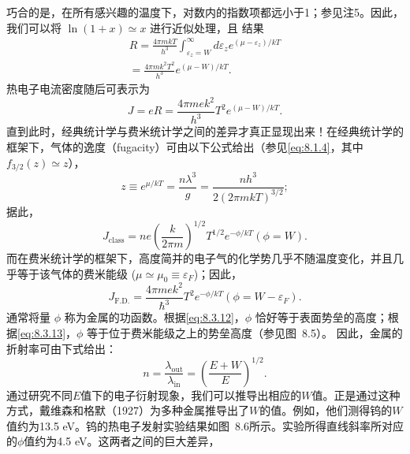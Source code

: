 巧合的是，在所有感兴趣的温度下，对数内的指数项都远小于1；参见注5。因此，我们可以将 \(\ln(1+x) \simeq x\) 进行近似处理，且
结果
\begin{equation}\tag{8.3.9}\label{eq:8.3.9}
\begin{array}{r} { R = \frac { 4 \pi m k T } { h ^{3} } \int _ { \varepsilon _ { z } = W } ^{\infty} d \varepsilon _ { z } e ^{( \mu - \varepsilon _ { z} ) / k T } } \\{ = \frac { 4 \pi m k ^{2} T ^{2} } { h ^{3} } e ^{( \mu - W ) / k T} . } \end{array}
\end{equation}
热电子电流密度随后可表示为
\begin{equation}\tag{8.3.10}\label{eq:8.3.10}
J = e R = \frac { 4 \pi m e k ^{2} } { h ^{3} } T ^{2} e ^{( \mu - W ) / k T} .
\end{equation}
直到此时，经典统计学与费米统计学之间的差异才真正显现出来！在经典统计学的框架下，气体的逸度（fugacity）可由以下公式给出（参见\autoref{eq:8.1.4}，其中 \(f_{3/2}(z) \simeq z\)），
\begin{equation}\tag{8.3.11}\label{eq:8.3.11}
z \equiv e ^{\mu / k T} = \frac { n \lambda ^{3} } { g } = \frac { n h ^{3} } { 2 ( 2 \pi m k T ) ^{3 / 2} } ;
\end{equation}
据此，
\begin{equation}\tag{8.3.12}\label{eq:8.3.12}
J _ { \mathrm { c l a s s } } = n e \left( \frac { k } { 2 \pi m } \right) ^{1 / 2} T ^{1 / 2} e ^{- \phi / k T}  ( \phi = W ) .
\end{equation}
而在费米统计学的框架下，高度简并的电子气的化学势几乎不随温度变化，并且几乎等于该气体的费米能级 (\(\mu \simeq \mu_0 \equiv \varepsilon_F\))；因此，
\begin{equation}\tag{8.3.13}\label{eq:8.3.13}
J _ { \mathrm { F . D . } } = \frac { 4 \pi m e k ^{2} } { \hbar ^{3} } T ^{2} e ^{- \phi / k T}  ( \phi = W - \varepsilon _ { F } ) .
\end{equation}
通常将量 \(\phi\) 称为金属的功函数。根据\autoref{eq:8.3.12}，\(\phi\) 恰好等于表面势垒的高度；根据\autoref{eq:8.3.13}，\(\phi\) 等于位于费米能级之上的势垒高度（参见图~8.5）。
因此，金属的折射率可由下式给出：
\begin{equation}\tag{8.3.14}\label{eq:8.3.14}
n = \frac { \lambda _ { \mathrm { o u t } } } { \lambda _ { \mathrm { i n } } } = \left( \frac { E + W } { E } \right) ^{1 / 2} .
\end{equation}
通过研究不同\(E\)值下的电子衍射现象，我们可以推导出相应的\(W\)值。正是通过这种方式，戴维森和格默（1927）为多种金属推导出了\(W\)的值。例如，他们测得钨的\(W\)值约为13.5 eV。钨的热电子发射实验结果如图~8.6所示。实验所得直线斜率所对应的\(\phi\)值约为4.5 eV。这两者之间的巨大差异，
